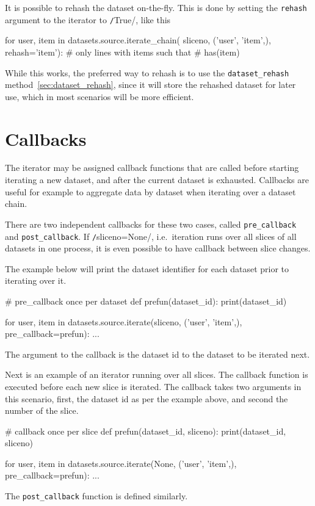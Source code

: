 It is possible to rehash the dataset on-the-fly.  This is done by
setting the \texttt{rehash} argument to the iterator to
\texttt/True/, like this
\begin{python}
for user, item in datasets.source.iterate_chain(
        sliceno, ('user', 'item',),
        rehash='item'):
    # only lines with items such that
    # has(item) %
\end{python}
While this works, the preferred way to rehash is to use the
\texttt{dataset\_rehash} method~\ref{sec:dataset_rehash},
since it will store the rehashed dataset for later use, which in most
scenarios will be more efficient.






\section{Callbacks}
\label{sec:callback}
The iterator may be assigned callback functions that are called before
starting iterating a new dataset, and after the current dataset is
exhausted.  Callbacks are useful for example to aggregate data by
dataset when iterating over a dataset chain.

There are two independent callbacks for these two cases,
called \texttt{pre\_callback} and \texttt{post\_callback}.
If \texttt/sliceno=None/, i.e.\ iteration runs over all
slices of all datasets in one process, it is even possible to have
callback between slice changes.

The example below will print the dataset identifier for each dataset
prior to iterating over it.
\begin{python}
# pre_callback once per dataset
def prefun(dataset_id):
    print(dataset_id)

for user, item in datasets.source.iterate(sliceno, ('user', 'item',),
                                          pre_callback=prefun):
    ...
\end{python}
The argument to the callback is the dataset id to the dataset to be
iterated next.

Next is an example of an iterator running over all slices.  The
callback function is executed before each new slice is iterated.  The
callback takes two arguments in this scenario, first, the dataset id
as per the example above, and second the number of the slice.
\begin{python}
# callback once per slice
def prefun(dataset_id, sliceno):
    print(dataset_id, sliceno)

for user, item in datasets.source.iterate(None, ('user', 'item',),
                                          pre_callback=prefun):
    ...
\end{python}
The \texttt{post\_callback} function is defined similarly.



